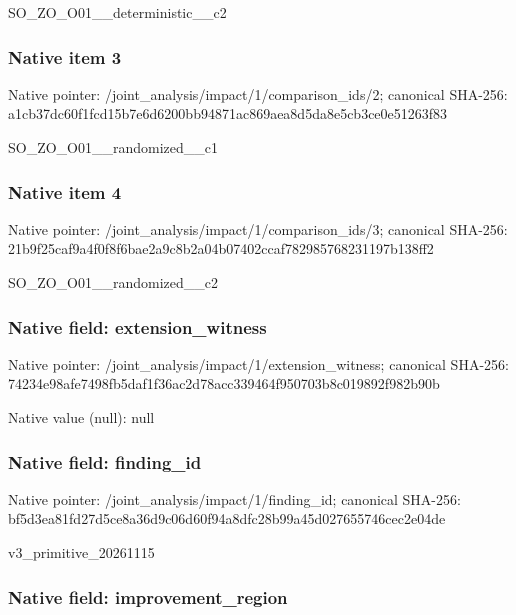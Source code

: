 \documentclass[10pt,a4paper]{article}
\begin{document}
SO\_ZO\_O01\_\_deterministic\_\_c2


\subsubsection{Native item 3}


Native pointer: /joint\_analysis/impact/1\allowbreak{}/comparison\_ids/2; canonical SHA-256: a1cb37dc60f1fcd15b7e6d62\allowbreak{}00bb94871ac869aea8d5da8e\allowbreak{}5cb3ce0e51263f83


SO\_ZO\_O01\_\_randomized\_\_c1


\subsubsection{Native item 4}


Native pointer: /joint\_analysis/impact/1\allowbreak{}/comparison\_ids/3; canonical SHA-256: 21b9f25caf9a4f0f8f6bae2a\allowbreak{}9c8b2a04b07402ccaf782985\allowbreak{}768231197b138ff2


SO\_ZO\_O01\_\_randomized\_\_c2


\subsubsection{Native field: extension\_witness}


Native pointer: /joint\_analysis/impact/1\allowbreak{}/extension\_witness; canonical SHA-256: 74234e98afe7498fb5daf1f3\allowbreak{}6ac2d78acc339464f950703b\allowbreak{}8c019892f982b90b



Native value (null): null



\subsubsection{Native field: finding\_id}


Native pointer: /joint\_analysis/impact/1/finding\_id; canonical SHA-256: bf5d3ea81fd27d5ce8a36d9c\allowbreak{}06d60f94a8dfc28b99a45d02\allowbreak{}7655746cec2e04de


v3\_primitive\_20261115


\subsubsection{Native field: improvement\_region}
\end{document}
